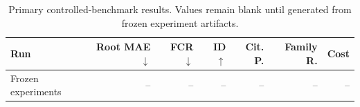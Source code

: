 \newcommand{\ResultStatus}{RESULTS PENDING---DO NOT SUBMIT}
\begin{table}[t]
\centering
\small
\begin{tabular}{lrrrrrr}
\toprule
Run & Root MAE $\downarrow$ & FCR $\downarrow$ & ID $\uparrow$ & Cit. P. & Family R. & Cost \\
\midrule
Frozen experiments & -- & -- & -- & -- & -- & -- \\
\bottomrule
\end{tabular}
\caption{Primary controlled-benchmark results. Values remain blank until generated from frozen experiment artifacts.}
\label{tab:main-results}
\end{table}

